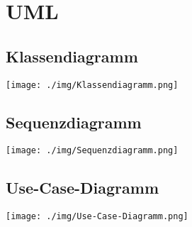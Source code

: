 \chapter{UML}

\section{Klassendiagramm}
\begin{minipage}{\linewidth}
\centering%
\texttt{[image: ./img/Klassendiagramm.png]}%
%
\label{fig:Klassendiagramm}%
\end{minipage}
\vspace{10px}


\section{Sequenzdiagramm}
\begin{minipage}{\linewidth}
\centering%
\texttt{[image: ./img/Sequenzdiagramm.png]}%
%
\label{fig:Sequenzdiagramm}%
\end{minipage} 
\vspace{10px}




\section{Use-Case-Diagramm}
\begin{minipage}{\linewidth}
\centering%
\texttt{[image: ./img/Use-Case-Diagramm.png]}%
\centering
{}%
\label{fig:Use-Case-Diagramm}%
\end{minipage}
\vspace{10px}
